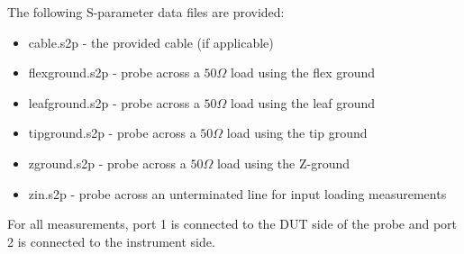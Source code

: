 \documentclass[11pt]{article}
\begin{document}
The following S-parameter data files are provided:
\begin{itemize}
\item cable.s2p - the provided cable (if applicable)
\item flexground.s2p - probe across a $50 \Omega$ load using the flex ground
\item leafground.s2p - probe across a $50 \Omega$ load using the leaf ground
\item tipground.s2p - probe across a $50 \Omega$ load using the tip ground
\item zground.s2p - probe across a $50 \Omega$ load using the Z-ground
\item zin.s2p - probe across an unterminated line for input loading measurements
\end{itemize}

For all measurements, port 1 is connected to the DUT side of the probe and port 2 is connected to the instrument side.
\end{document}
